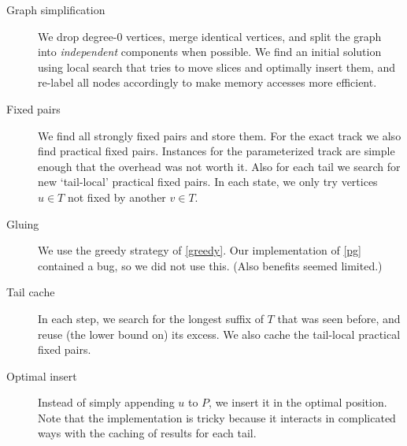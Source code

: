 \documentclass[a4paper,UKenglish,cleveref, autoref, thm-restate]{lipics-v2021}
\begin{document}
\begin{description}
  \item[Graph simplification] We drop degree-$0$ vertices, merge identical
    vertices, and split the graph into \emph{independent} components when
    possible. We find an initial solution using local search that tries to move
    slices and optimally insert them, and re-label all nodes accordingly to make
    memory accesses more efficient.
  \item[Fixed pairs] We find all strongly fixed pairs and store them. For the
    exact track we also find practical fixed pairs. Instances for the parameterized
    track are simple enough that the overhead was not worth it. Also for each
    tail we search for new `tail-local' practical fixed pairs. In each state, we only
    try vertices $u\in T$ not fixed by another $v\in T$.
  \item[Gluing] We use the greedy strategy of \cref{greedy}. Our implementation
    of \cref{pg} contained a bug, so we did not use this. (Also benefits
    seemed limited.)
  \item[Tail cache] In each step, we search for the longest suffix of $T$ that
    was seen before, and reuse (the lower bound on) its excess. We also
    cache the tail-local practical fixed pairs.
  \item[Optimal insert] Instead of simply appending $u$ to $P$, we
    insert it in the optimal position. Note that the
    implementation is tricky because it interacts in complicated ways with
    the caching of results for each tail.
\end{description}
\end{document}
